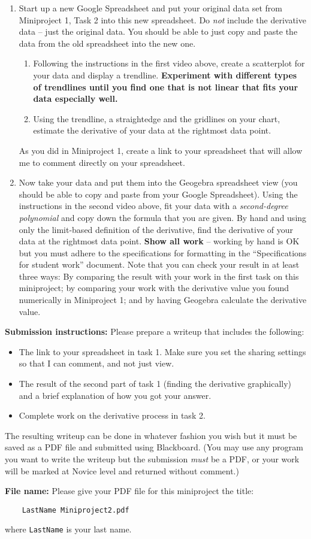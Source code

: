 \documentclass[11pt,letterpaper]{article}
\begin{document}
\bigskip

\begin{enumerate}
	\item Start up a new Google Spreadsheet and put your original data set from Miniproject 1, Task 2 into this new spreadsheet. Do \emph{not} include the derivative data -- just the original data. You should be able to just copy and paste the data from the old spreadsheet into the new one. 
		\begin{enumerate}
			\item Following the instructions in the first video above, create a scatterplot for your data and display a trendline. \textbf{Experiment with different types of trendlines until you find one that is not linear that fits your data especially well.}
			\item Using the trendline, a straightedge and the gridlines on your chart, estimate the derivative of your data at the rightmost data point. 
		\end{enumerate}
	As you did in Miniproject 1, create a link to your spreadsheet that will allow me to comment directly on your spreadsheet. 

	\item Now take your data and put them into the Geogebra spreadsheet view (you should be able to copy and paste from your Google Spreadsheet). Using the instructions in the second video above, fit your data with a \emph{second-degree polynomial} and copy down the formula that you are given. By hand and using only the limit-based definition of the derivative, find the derivative of your data at the rightmost data point. \textbf{Show all work} -- working by hand is OK but you must adhere to the specifications for formatting in the ``Specifications for student work'' document. Note that you can check your result in at least three ways: By comparing the result with your work in the first task on this miniproject; by comparing your work with the derivative value you found numerically in Miniproject 1; and by having Geogebra calculate the derivative value. 

\end{enumerate}

\hrulefill

\noindent
\textbf{Submission instructions:} Please prepare a writeup that includes the following: 
	\begin{itemize}
		\item The link to your spreadsheet in task 1. Make sure you set the sharing settings so that I can comment, and not just view. 
		\item The result of the second part of task 1 (finding the derivative graphically) and a brief explanation of how you got your answer. 
		\item Complete work on the derivative process in task 2. 
	\end{itemize}
The resulting writeup can be done in whatever fashion you wish but it must be saved as a PDF file and submitted using Blackboard. (You may use any program you want to write the writeup but the submission \emph{must} be a PDF, or your work will be marked at Novice level and returned without comment.) 

\noindent
\textbf{File name:} Please give your PDF file for this miniproject the title: 
\begin{verbatim}
	LastName Miniproject2.pdf
\end{verbatim}
where \texttt{LastName} is your last name. 
\end{document}
